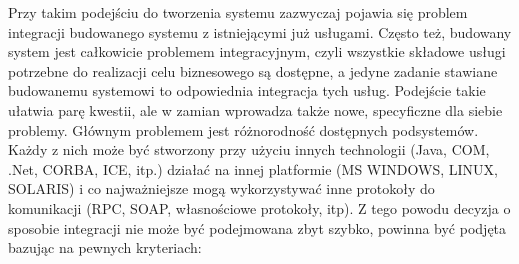 Przy takim podejściu do tworzenia systemu zazwyczaj pojawia się problem integracji budowanego systemu z istniejącymi już usługami. Często też, budowany system jest całkowicie problemem integracyjnym, czyli wszystkie składowe usługi potrzebne do realizacji celu biznesowego są dostępne, a jedyne zadanie stawiane budowanemu systemowi to odpowiednia integracja tych usług. Podejście takie ułatwia parę kwestii, ale w zamian wprowadza także nowe, specyficzne dla siebie problemy. Głównym problemem jest różnorodność dostępnych podsystemów. Każdy z nich może być stworzony przy użyciu innych technologii (Java, COM, .Net, CORBA, ICE, itp.) działać na innej platformie (MS WINDOWS, LINUX, SOLARIS) i co najważniejsze mogą wykorzystywać inne protokoły do komunikacji (RPC, SOAP, własnościowe protokoły, itp). Z tego powodu decyzja o sposobie integracji nie może być podejmowana zbyt szybko,  powinna być podjęta bazując na pewnych kryteriach:  \cite{hohpewoolf2003} 

